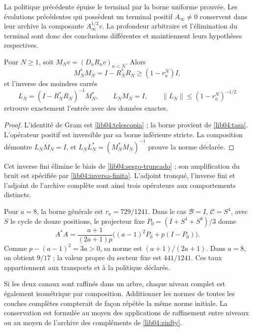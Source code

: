 La politique précédente épuise le terminal par la borne uniforme prouvée.
Les évolutions précédentes qui possèdent un terminal positif
\(A_\infty\neq0\) conservent dans leur archive la composante
\(A_\infty^{1/2}v\). La profondeur arbitraire et l’élimination du
terminal sont donc des conclusions différentes et maintiennent leurs
hypothèses respectives.

\begin{proposition}
\label{lib04:prop-inversa-finita}
Pour \(N\geq1\), soit \(M_Nv=(D_nR_nv)_{n<N}\). Alors
\begin{equation}
 M_N^*M_N=I-R_N^*R_N\geq(1-r_a^N)I,
 \label{lib04:gram-finito}
\end{equation}
et l’inverse des moindres carrés
\begin{equation}
 L_N=(I-R_N^*R_N)^{-1}M_N^*,\qquad
 L_NM_N=I,\qquad
 \|L_N\|\leq(1-r_a^N)^{-1/2}
 \label{lib04:inversa-finita}
\end{equation}
retrouve exactement l’entrée avec des données exactes.
\end{proposition}

\begin{proof}
L’identité de Gram est \eqref{lib04:telescopia} ; la borne provient de
\eqref{lib04:tasa}. L’opérateur positif est inversible par sa borne
inférieure stricte. La composition démontre \(L_NM_N=I\), et
\(L_NL_N^*=(M_N^*M_N)^{-1}\) prouve la norme déclarée.
\end{proof}

Cet inverse fini élimine le biais de
\eqref{lib04:sesgo-truncado} ; son amplification du bruit est
spécifiée par \eqref{lib04:inversa-finita}. L’adjoint tronqué,
l’inverse fini et l’adjoint de l’archive complète sont ainsi trois
opérateurs aux comportements distincts.

Pour \(a=8\), la borne générale est \(r_a=729/1241\). Dans le cas \(\mathcal B=I\), \(\mathcal C=S^4\), avec \(S\) le cycle de douze positions, le projecteur fixe \(P_0=(I+S^4+S^8)/3\) donne
\begin{equation}
 A^*A=\frac{a+1}{(2a+1)p}
       \bigl((a-1)^2P_0+p(I-P_0)\bigr).
 \label{lib04:gram-tasa-ternaria}
\end{equation}
Comme \(p-(a-1)^2=3a>0\), sa norme est
\((a+1)/(2a+1)\). Dans \(a=8\), on obtient \(9/17\) ; la valeur propre
du secteur fixe est \(441/1241\). Ces taux appartiennent aux
transports et à la politique déclarés.

Si les deux canaux sont raffinés dans un arbre, chaque niveau complet est également isométrique par composition. Additionner les normes de toutes les couches complètes compterait de façon répétée la même norme initiale. La conservation est formulée au moyen des applications de raffinement entre niveaux ou au moyen de l'archive des compléments de \eqref{lib04:zinfty}.

